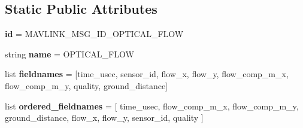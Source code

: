 \subsection*{Static Public Attributes}
\begin{DoxyCompactItemize}
\item 
\mbox{\label{classpymavlink_1_1dialects_1_1v10_1_1MAVLink__optical__flow__message_ab45a1777015630ec490e03d72d7bbab1}} 
{\bfseries id} = M\+A\+V\+L\+I\+N\+K\+\_\+\+M\+S\+G\+\_\+\+I\+D\+\_\+\+O\+P\+T\+I\+C\+A\+L\+\_\+\+F\+L\+OW
\item 
\mbox{\label{classpymavlink_1_1dialects_1_1v10_1_1MAVLink__optical__flow__message_a5d9c3b6b35e1274161a92ca3a557cce6}} 
string {\bfseries name} = \textquotesingle{}O\+P\+T\+I\+C\+A\+L\+\_\+\+F\+L\+OW\textquotesingle{}
\item 
\mbox{\label{classpymavlink_1_1dialects_1_1v10_1_1MAVLink__optical__flow__message_ab766fe5e3a2be5429ea6ec4084c616ad}} 
list {\bfseries fieldnames} = \mbox{[}\textquotesingle{}time\+\_\+usec\textquotesingle{}, \textquotesingle{}sensor\+\_\+id\textquotesingle{}, \textquotesingle{}flow\+\_\+x\textquotesingle{}, \textquotesingle{}flow\+\_\+y\textquotesingle{}, \textquotesingle{}flow\+\_\+comp\+\_\+m\+\_\+x\textquotesingle{}, \textquotesingle{}flow\+\_\+comp\+\_\+m\+\_\+y\textquotesingle{}, \textquotesingle{}quality\textquotesingle{}, \textquotesingle{}ground\+\_\+distance\textquotesingle{}\mbox{]}
\item 
\mbox{\label{classpymavlink_1_1dialects_1_1v10_1_1MAVLink__optical__flow__message_aef8550639f347c9af81bb89edfe638de}} 
list {\bfseries ordered\+\_\+fieldnames} = \mbox{[} \textquotesingle{}time\+\_\+usec\textquotesingle{}, \textquotesingle{}flow\+\_\+comp\+\_\+m\+\_\+x\textquotesingle{}, \textquotesingle{}flow\+\_\+comp\+\_\+m\+\_\+y\textquotesingle{}, \textquotesingle{}ground\+\_\+distance\textquotesingle{}, \textquotesingle{}flow\+\_\+x\textquotesingle{}, \textquotesingle{}flow\+\_\+y\textquotesingle{}, \textquotesingle{}sensor\+\_\+id\textquotesingle{}, \textquotesingle{}quality\textquotesingle{} \mbox{]}
\item 

\end{DoxyCompactItemize}
